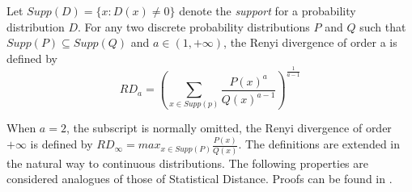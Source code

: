 \begin{definition}
   Let \(Supp(D) = \{x: D(x) \neq 0\}\) denote the
  \textit{support} for a probability distribution \(D\). For any two discrete
  probability distributions \(P\) and \(Q\) such that
  \(Supp(P) \subseteq Supp(Q)\) and \(a \in (1, +\infty)\), the Renyi divergence
  of order a is defined by\\
  $$RD_{a} = \left(\sum_{x \in Supp(p)}\frac{P(x)^{a}}{Q(x)^{a-1}}\right)^{\frac{1}{a-1}}$$
\end{definition}
When \(a = 2\), the subscript is normally omitted, the Renyi divergence of
order \(+\infty\) is defined by
\(RD_{\infty} = max_{x \in Supp(P)}\frac{P(x)}{Q(x)}\). The definitions are
extended in the natural way to continuous distributions. The following
properties are considered analogues of those of Statistical Distance. Proofs can
be found in \cite{langlois2014gghlite}.
